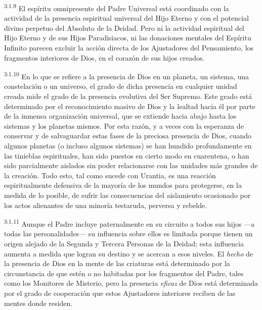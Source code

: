 \par
\textsuperscript{3:1.9} El espíritu omnipresente del Padre Universal está coordinado con la actividad de la presencia espiritual universal del Hijo Eterno y con el potencial divino perpetuo del Absoluto de la Deidad. Pero ni la actividad espiritual del Hijo Eterno y de sus Hijos Paradisiacos, ni las donaciones mentales del Espíritu Infinito parecen excluir la acción directa de los Ajustadores del Pensamiento, los fragmentos interiores de Dios, en el corazón de sus hijos creados.

\par
\textsuperscript{3:1.10} En lo que se refiere a la presencia de Dios en un planeta, un sistema, una constelación o un universo, el grado de dicha presencia en cualquier unidad creada mide el grado de la presencia evolutiva del Ser Supremo. Este grado está determinado por el reconocimiento masivo de Dios y la lealtad hacia él por parte de la inmensa organización universal, que se extiende hacia abajo hasta los sistemas y los planetas mismos. Por esta razón, y a veces con la esperanza de conservar y de salvaguardar estas fases de la preciosa presencia de Dios, cuando algunos planetas (o incluso algunos sistemas) se han hundido profundamente en las tinieblas espirituales, han sido puestos en cierto modo en cuarentena, o han sido parcialmente aislados sin poder relacionarse con las unidades más grandes de la creación. Todo esto, tal como sucede con Urantia, es una reacción espiritualmente defensiva de la mayoría de los mundos para protegerse, en la medida de lo posible, de sufrir las consecuencias del aislamiento ocasionado por los actos alienantes de una minoría testaruda, perversa y rebelde.

\par
\textsuperscript{3:1.11} Aunque el Padre incluye paternalmente en su circuito a todos sus hijos ---a todas las personalidades--- su influencia sobre ellos es limitada porque tienen un origen alejado de la Segunda y Tercera Personas de la Deidad; esta influencia aumenta a medida que logran su destino y se acercan a esos niveles. El \textit{hecho} de la presencia de Dios en la mente de las criaturas está determinado por la circunstancia de que estén o no habitadas por los fragmentos del Padre, tales como los Monitores de Misterio, pero la presencia \textit{eficaz} de Dios está determinada por el grado de cooperación que estos Ajustadores interiores reciben de las mentes donde residen.


